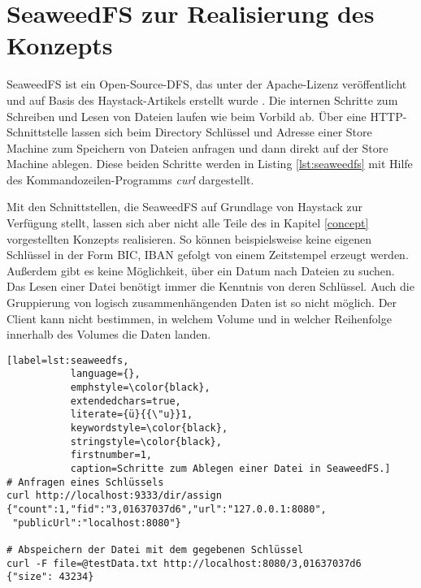 \documentclass[12pt,oneside,a4paper,parskip]{scrbook}
\begin{document}
\section{SeaweedFS zur Realisierung des Konzepts}
SeaweedFS ist ein Open-Source-DFS, das unter der Apache-Lizenz veröffentlicht und auf Basis des Haystack-Artikels erstellt wurde \cite{seaweedfsRepo}. Die internen Schritte zum Schreiben und Lesen von Dateien laufen wie beim Vorbild ab. Über eine HTTP-Schnittstelle lassen sich beim Directory Schlüssel und Adresse einer Store Machine zum Speichern von Dateien anfragen und dann direkt auf der Store Machine ablegen. Diese beiden Schritte werden in Listing \ref{lst:seaweedfs} mit Hilfe des Kommandozeilen-Programms \textit{curl} dargestellt. 

Mit den Schnittstellen, die SeaweedFS auf Grundlage von Haystack zur Verfügung stellt, lassen sich aber nicht alle Teile des in Kapitel \ref{concept} vorgestellten Konzepts realisieren. So können beispielsweise keine eigenen Schlüssel in der Form BIC, IBAN gefolgt von einem Zeitstempel erzeugt werden. Außerdem gibt es keine Möglichkeit, über ein Datum nach Dateien zu suchen. Das Lesen einer Datei benötigt immer die Kenntnis von deren Schlüssel. Auch die Gruppierung von logisch zusammenhängenden Daten ist so nicht möglich. Der Client kann nicht bestimmen, in welchem Volume und in welcher Reihenfolge innerhalb des Volumes die Daten landen.

\begin{minipage}{\linewidth}
\begin{lstlisting}[label=lst:seaweedfs,
           language={},
           emphstyle=\color{black},
           extendedchars=true,
           literate={ü}{{\"u}}1,
           keywordstyle=\color{black},
           stringstyle=\color{black},
           firstnumber=1,
           caption=Schritte zum Ablegen einer Datei in SeaweedFS.]           
# Anfragen eines Schlüssels
curl http://localhost:9333/dir/assign
{"count":1,"fid":"3,01637037d6","url":"127.0.0.1:8080",
 "publicUrl":"localhost:8080"}

# Abspeichern der Datei mit dem gegebenen Schlüssel
curl -F file=@testData.txt http://localhost:8080/3,01637037d6
{"size": 43234}
\end{lstlisting}
\end{minipage}
\end{document}
